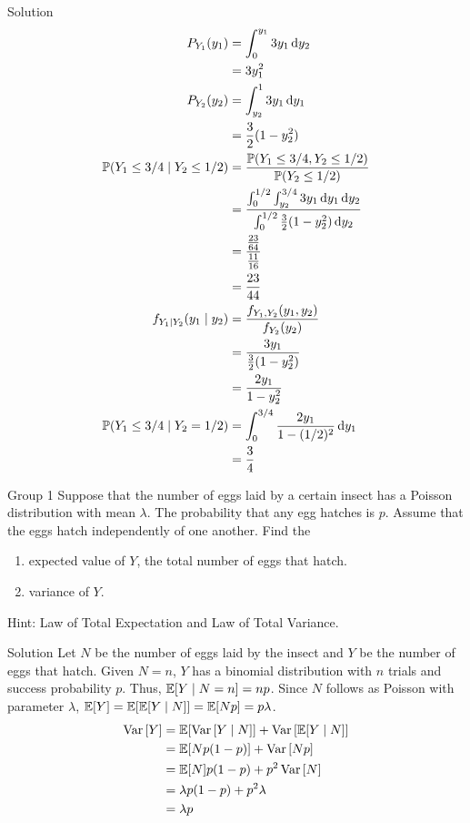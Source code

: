 \documentclass{article}
\begin{document}
\begin{solution}
    {Solution}
    \begin{align*}
        P_{Y_1}(y_1) &= \int_{0}^{y_1}3y_1\diff y_2 \\
        &= 3y_1^2 \\
        P_{Y_2}(y_2) &= \int_{y_2}^{1}3y_1\diff y_1 \\
        &= \frac{3}{2}(1-y_2^2) \\
        \condP{Y_1\leq 3/4}{Y_2\leq 1/2}
        &= \frac{\P{Y_1\leq 3/4,Y_2\leq 1/2}}{\P{Y_2\leq 1/2}} \\
        &= \frac{\int_{0}^{1/2}\int_{y_2}^{3/4}3y_1\diff y_1\diff y_2}{\int_{0}^{1/2}\frac{3}{2}(1-y_2^2)\diff y_2} \\
        &= \frac{\frac{23}{64}}{\frac{11}{16}} \\
        &= \frac{23}{44} \\
        f_{Y_1\mid Y_2}(y_1\mid y_2)
        &= \frac{f_{Y_1,Y_2}(y_1,y_2)}{f_{Y_2}(y_2)} \\
        &= \frac{3y_1}{\frac{3}{2}(1-y_2^2)} \\
        &= \frac{2y_1}{1-y_2^2} \\
        \condP{Y_1\leq 3/4}{Y_2=1/2}
        &= \int_{0}^{3/4}\frac{2y_1}{1-(1/2)^2}\diff y_1 \\
        &= \frac{3}{4}
    \end{align*}
\end{solution}
\begin{problem}
    {Group 1}
    Suppose that the number of eggs laid by a certain insect has a Poisson distribution with mean $\lambda$. The probability that any egg hatches is $p$. Assume that the eggs hatch independently of one another. Find the
    \begin{enumerate}
        \item expected value of $Y$, the total number of eggs that hatch.
        \item variance of $Y$.
    \end{enumerate}
    \begin{solution}
        {Hint:}
        Law of Total Expectation and Law of Total Variance.
    \end{solution}
\end{problem}

\begin{solution}
    {Solution}
    Let $N$ be the number of eggs laid by the insect and $Y$ be the number of eggs that hatch. Given $N = n$, $Y$ has a binomial distribution with $n$ trials and success probability $p$. Thus, $\condE{Y}{N = n} = np$. Since $N$ follows as Poisson with parameter $\lambda$, $\E{Y} = \E{\condE{Y}{N}} = \E{Np} = p\lambda$.
    \begin{align*}
        \Var{[Y]}
        &= \E{\Var{[Y\mid N]}}+\Var{[\E{Y\mid N}]} \\
        &= \E{Np(1-p)}+\Var{[Np]} \\
        &= \E{N}p(1-p)+p^2\Var{[N]} \\
        &= \lambda p(1-p)+p^2\lambda \\
        &= \lambda p
    \end{align*}
\end{solution}
\end{document}
